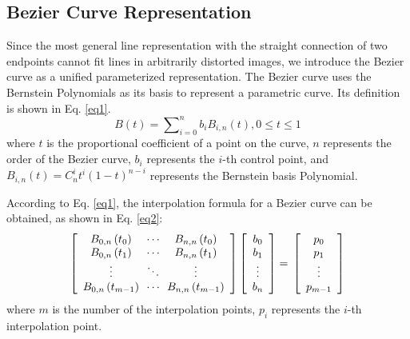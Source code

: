 \documentclass[letterpaper, 10 pt, conference]{ieeeconf}
\begin{document}
\subsection{Bezier Curve Representation} \label{sec3-1}
Since the most general line representation with the straight connection of two endpoints cannot fit lines in arbitrarily distorted images, we introduce the Bezier curve as a unified parameterized representation. The Bezier curve uses the Bernstein Polynomials as its basis to represent a parametric curve. Its definition is shown in Eq. \ref{eq1}.
\begin{equation} \label{eq1}
	B(t)=\sum \nolimits_{i=0}^{n} b_{i} B_{i, n}(t), 0 \leq t \leq 1
\end{equation}
where $t$ is the proportional coefficient of a point on the curve, $n$ represents the order of the Bezier curve, $b_i$ represents the $i$-th control point, and $B_{i,n}(t)=C_n^i t^i (1-t)^{n-i}$ represents the Bernstein basis Polynomial.

According to Eq. \ref{eq1}, the interpolation formula for a Bezier curve can be obtained, as shown in Eq. \ref{eq2}:
\begin{equation} \label{eq2} 
	\left[\begin{array}{ccc}
		B_{0,n}\left(t_{0}\right) \!&\! \cdots \!&\! B_{n,n}\left(t_{0}\right) \\
		B_{0,n}\left(t_{1}\right) \!&\! \cdots \!&\! B_{n,n}\left(t_{1}\right) \\
		\vdots \!&\! \ddots \!&\! \vdots \\
		B_{0,n}\left(t_{m-1}\right) \!&\! \cdots \!&\! B_{n,n}\left(t_{m-1}\right)
	\end{array}\right]
	\left[\begin{array}{c}
		b_{0} \\
		b_{1} \\
		\vdots  \\
		b_{n}
	\end{array}\right]
	= \\
	\left[\begin{array}{c}
		p_{0} \\
		p_{1} \\
		\vdots  \\
		p_{m-1}
	\end{array}\right]
\end{equation}
where $m$ is the number of the interpolation points, $p_i$ represents the $i$-th interpolation point.
\end{document}
